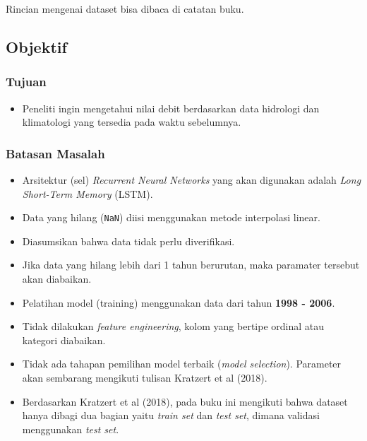 \documentclass[11pt]{article}
\providecommand{\tightlist}{%
      \setlength{\itemsep}{0pt}\setlength{\parskip}{0pt}}
\begin{document}
Rincian mengenai dataset bisa dibaca di catatan buku.

    \hypertarget{objektif}{%
\subsection{Objektif}\label{objektif}}

\hypertarget{tujuan}{%
\subsubsection{Tujuan}\label{tujuan}}

\begin{itemize}
\tightlist
\item
  Peneliti ingin mengetahui nilai debit berdasarkan data hidrologi dan
  klimatologi yang tersedia pada waktu sebelumnya.
\end{itemize}

\hypertarget{batasan-masalah}{%
\subsubsection{Batasan Masalah}\label{batasan-masalah}}

\begin{itemize}
\tightlist
\item
  Arsitektur (sel) \emph{Recurrent Neural Networks} yang akan digunakan
  adalah \emph{Long Short-Term Memory} (LSTM).
\item
  Data yang hilang (\texttt{NaN}) diisi menggunakan metode interpolasi
  linear.
\item
  Diasumsikan bahwa data tidak perlu diverifikasi.
\item
  Jika data yang hilang lebih dari 1 tahun berurutan, maka paramater
  tersebut akan diabaikan.
\item
  Pelatihan model (training) menggunakan data dari tahun \textbf{1998 -
  2006}.
\item
  Tidak dilakukan \emph{feature engineering}, kolom yang bertipe ordinal
  atau kategori diabaikan.
\item
  Tidak ada tahapan pemilihan model terbaik (\emph{model selection}).
  Parameter akan sembarang mengikuti tulisan Kratzert et al (2018).
\item
  Berdasarkan Kratzert et al (2018), pada buku ini mengikuti bahwa
  dataset hanya dibagi dua bagian yaitu \emph{train set} dan \emph{test
  set}, dimana validasi menggunakan \emph{test set}.
\end{itemize}
\end{document}
